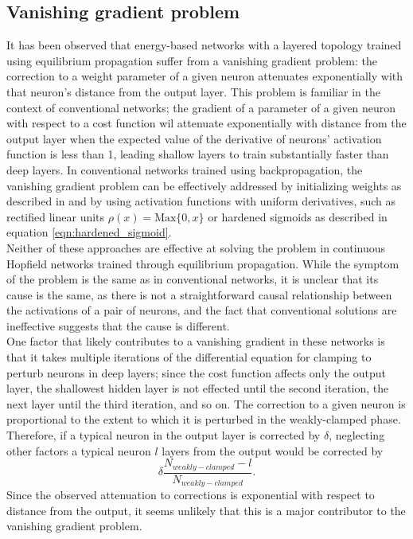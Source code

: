 \documentclass{article}
\newcommand{\npar}{\\\indent}
\begin{document}
\subsection{Vanishing gradient problem}

It has been observed \cite{scellier17} that energy-based networks with a layered topology trained using equilibrium propagation suffer from a vanishing gradient problem: the correction to a weight parameter of a given neuron attenuates exponentially with that neuron's distance from the output layer. This problem is familiar in the context of conventional networks; the gradient of a parameter of a given neuron with respect to a cost function wil attenuate exponentially with distance from the output layer when the expected value of the derivative of neurons' activation function is less than 1, leading shallow layers to train substantially faster than deep layers. In conventional networks trained using backpropagation, the vanishing gradient problem can be effectively addressed by initializing weights as described in \cite{glorot2010} and by using activation functions with uniform derivatives, such as rectified linear units $\rho(x)=\text{Max}\{0, x\}$ or hardened sigmoids as described in equation \ref{eqn:hardened_sigmoid}.
\npar
Neither of these approaches are effective at solving the problem in continuous Hopfield networks trained through equilibrium propagation. While the symptom of the problem is the same as in conventional networks, it is unclear that its cause is the same, as there is not a straightforward causal relationship between the activations of a pair of neurons, and the fact that conventional solutions are ineffective suggests that the cause is different.
\npar
One factor that likely contributes to a vanishing gradient in these networks is that it takes multiple iterations of the differential equation for clamping to perturb neurons in deep layers; since the cost function affects only the output layer, the shallowest hidden layer is not effected until the second iteration, the next layer until the third iteration, and so on. The correction to a given neuron is proportional to the extent to which it is perturbed in the weakly-clamped phase. Therefore, if a typical neuron in the output layer is corrected by $\delta$, neglecting other factors a typical neuron $l$ layers from the output would be corrected by \begin{equation}\delta\frac{N_{weakly-clamped}-l}{N_{weakly-clamped}}.\end{equation} Since the observed attenuation to corrections is exponential with respect to distance from the output, it seems unlikely that this is a major contributor to the vanishing gradient problem.
\end{document}
